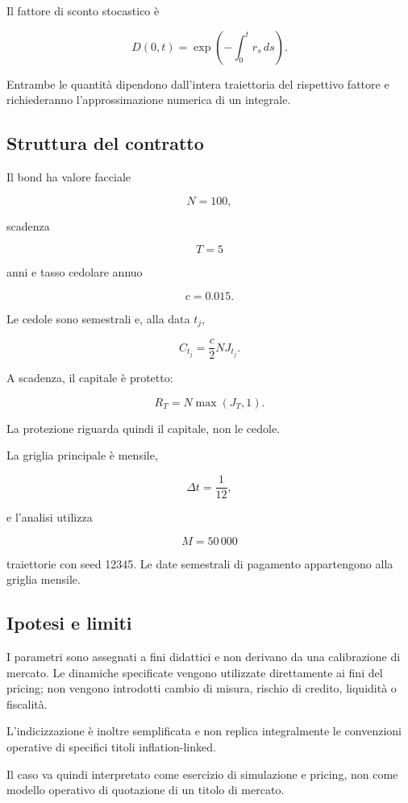 Il fattore di sconto stocastico \`e

\[
D(0,t)
=
\exp\left(
-\int_0^t r_s\,ds
\right).
\]

Entrambe le quantit\`a dipendono dall'intera traiettoria del rispettivo
fattore e richiederanno l'approssimazione numerica di un integrale.

\subsection{Struttura del contratto}

Il bond ha valore facciale

\[
N=100,
\]

\noindent scadenza

\[
T=5
\]

\noindent anni e tasso cedolare annuo

\[
c=0.015.
\]

Le cedole sono semestrali e, alla data \(t_j\),

\[
C_{t_j}
=
\frac{c}{2}N J_{t_j}.
\]

A scadenza, il capitale \`e protetto:

\[
R_T
=
N\max(J_T,1).
\]

La protezione riguarda quindi il capitale, non le cedole.

La griglia principale \`e mensile,

\[
\Delta t=\frac{1}{12},
\]

\noindent e l'analisi utilizza

\[
M=50\,000
\]

\noindent traiettorie con seed 12345. Le date semestrali di pagamento appartengono alla
griglia mensile.

\subsection{Ipotesi e limiti}

I parametri sono assegnati a fini didattici e non derivano da una calibrazione
di mercato. Le dinamiche specificate vengono utilizzate direttamente ai fini
del pricing; non vengono introdotti cambio di misura, rischio di credito,
liquidit\`a o fiscalit\`a.

L'indicizzazione \`e inoltre semplificata e non replica integralmente le
convenzioni operative di specifici titoli inflation-linked.

Il caso va quindi interpretato come esercizio di simulazione e pricing, non
come modello operativo di quotazione di un titolo di mercato.



